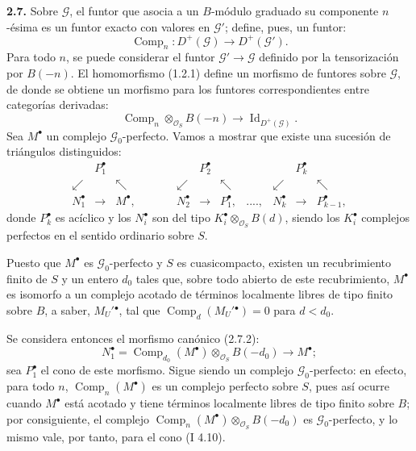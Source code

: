 \providecommand{\sisi}[2]{#2}

\textbf{2.7.} Sobre $\mathcal G$, el funtor que asocia a un $B$-módulo graduado su componente $n$-ésima es un funtor exacto con valores en $\mathcal G'$; define, pues, un funtor:
\begin{equation}\tag{2.7.1}
  \operatorname{Comp}_n:D^+(\mathcal G)\longrightarrow D^+(\mathcal G').
\end{equation}
Para todo $n$, se puede considerar el funtor $\mathcal G'\to\mathcal G$ definido por la tensorización por $B(-n)$. El homomorfismo (1.2.1) define un morfismo de funtores sobre $\mathcal G$, de donde se obtiene un morfismo para los funtores correspondientes entre categorías derivadas:
\begin{equation}\tag{2.7.2}
  \operatorname{Comp}_n\otimes_{\mathcal O_S} B(-n)
  \longrightarrow \operatorname{Id}_{D^+(\mathcal G)}.
\end{equation}
Sea $M^{\bullet}$ un complejo $\mathcal G_0$-perfecto. Vamos a mostrar que existe una sucesión de triángulos distinguidos:
\[
\begin{array}{ccccccccccc}
& P_1^{\bullet} &&&& P_2^{\bullet} &&&& P_k^{\bullet} & \\
\swarrow && \nwarrow && \swarrow && \nwarrow && \swarrow && \nwarrow \\
N_1^{\bullet} & \longrightarrow & M^{\bullet}, & \qquad &
N_2^{\bullet} & \longrightarrow & P_1^{\bullet}, & ...., &
N_k^{\bullet} & \longrightarrow & P_{k-1}^{\bullet},
\end{array}
\]
donde $P_k^{\bullet}$ es acíclico y los $N_i^{\bullet}$ son del tipo \(K_i^{\bullet}\otimes_{\mathcal O_S}B(d)\), siendo los $K_i^{\bullet}$ complejos perfectos en el sentido ordinario sobre $S$.

Puesto que $M^{\bullet}$ es $\mathcal G_0$-perfecto y $S$ es cuasicompacto, existen un recubrimiento finito de $S$ y un entero $d_0$ tales que, sobre todo abierto de este recubrimiento, $M^{\bullet}$ es isomorfo a un complejo acotado de términos localmente libres de tipo finito sobre $B$, a saber, $M_U'{}^{\bullet}$, tal que $\operatorname{Comp}_d(M_U'{}^{\bullet})=0$ para $d<d_0$.

Se considera entonces el morfismo canónico (2.7.2):
\[
  N_1^{\bullet}=\operatorname{Comp}_{d_0}(M^{\bullet})\otimes_{\mathcal O_S}B(-d_0)
  \longrightarrow M^{\bullet};
\]
sea $P_1^{\bullet}$ el cono de este morfismo. Sigue siendo un complejo $\mathcal G_0$-perfecto: en efecto, para todo $n$, $\operatorname{Comp}_n(M^{\bullet})$ es un complejo perfecto sobre $S$, pues así ocurre cuando $M^{\bullet}$ está acotado y tiene términos localmente libres de tipo finito sobre $B$; por consiguiente, el complejo $\operatorname{Comp}_n(M^{\bullet})\otimes_{\mathcal O_S}B(-d_0)$ es $\mathcal G_0$-perfecto, y lo mismo vale, por tanto, para el cono (I 4.10).

